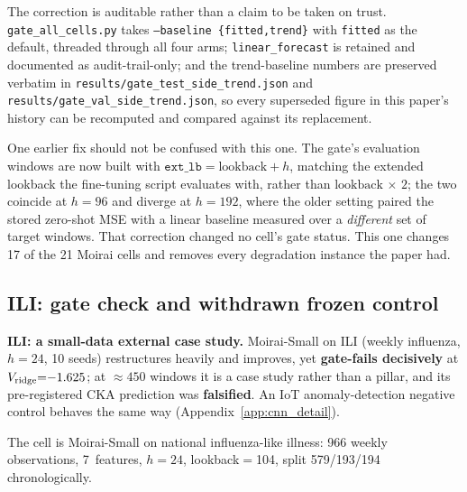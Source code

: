 The correction is auditable rather than a claim to be taken on trust.
\texttt{gate\_all\_cells.py} takes \texttt{--baseline \{fitted,trend\}} with
\texttt{fitted} as the default, threaded through all four arms;
\texttt{linear\_forecast} is retained and documented as audit-trail-only; and
the trend-baseline numbers are preserved verbatim in
\texttt{results/gate\_test\_side\_trend.json} and
\texttt{results/gate\_val\_side\_trend.json}, so every superseded figure in
this paper's history can be recomputed and compared against its replacement.

One earlier fix should not be confused with this one. The gate's evaluation
windows are now built with $\texttt{ext\_lb} = \text{lookback} + h$, matching
the extended lookback the fine-tuning script evaluates with, rather than
$\text{lookback}\,{\times}\,2$; the two coincide at $h{=}96$ and diverge at
$h{=}192$, where the older setting paired the stored zero-shot MSE with a
linear baseline measured over a \emph{different} set of target windows.
That correction changed no cell's gate status. This one changes 17 of the 21
Moirai cells and removes every degradation instance the paper had.

\subsection{ILI: gate check and withdrawn frozen control}
\label{app:ili_gate}

\textbf{ILI: a small-data external case study.}
Moirai-Small on ILI (weekly influenza, $h{=}24$, 10 seeds) restructures heavily
and improves, yet \textbf{gate-fails decisively} at
$V_{\text{ridge}}{=}{-}1.625$; at ${\approx}450$ windows it is a case study
rather than a pillar, and its pre-registered CKA prediction was
\textbf{falsified}.  An IoT anomaly-detection negative control behaves the same
way (Appendix~\ref{app:cnn_detail}).

The cell is Moirai-Small on national influenza-like illness: 966 weekly
observations, 7~features, $h{=}24$, lookback$=$104, split 579/193/194
chronologically.

